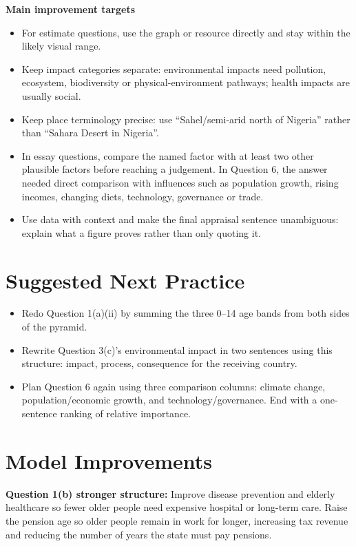 \documentclass[11pt]{article}
\begin{document}
\textbf{Main improvement targets}
\begin{itemize}
  \item For estimate questions, use the graph or resource directly and stay within the likely visual range.
  \item Keep impact categories separate: environmental impacts need pollution, ecosystem, biodiversity or physical-environment pathways; health impacts are usually social.
  \item Keep place terminology precise: use ``Sahel/semi-arid north of Nigeria'' rather than ``Sahara Desert in Nigeria''.
  \item In essay questions, compare the named factor with at least two other plausible factors before reaching a judgement. In Question 6, the answer needed direct comparison with influences such as population growth, rising incomes, changing diets, technology, governance or trade.
  \item Use data with context and make the final appraisal sentence unambiguous: explain what a figure proves rather than only quoting it.
\end{itemize}

\section*{Suggested Next Practice}

\begin{itemize}
  \item Redo Question 1(a)(ii) by summing the three 0--14 age bands from both sides of the pyramid.
  \item Rewrite Question 3(c)'s environmental impact in two sentences using this structure: impact, process, consequence for the receiving country.
  \item Plan Question 6 again using three comparison columns: climate change, population/economic growth, and technology/governance. End with a one-sentence ranking of relative importance.
\end{itemize}

\section*{Model Improvements}

\textbf{Question 1(b) stronger structure:}
Improve disease prevention and elderly healthcare so fewer older people need expensive hospital or long-term care. Raise the pension age so older people remain in work for longer, increasing tax revenue and reducing the number of years the state must pay pensions.
\end{document}

